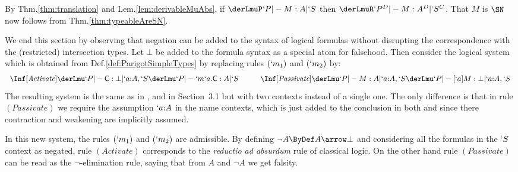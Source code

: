 \documentclass{CSML}
\begin{document}
 \begin{Proof} By Thm.\skp\ref{thm:translation} and Lem.\skp\ref{lem:derivableMuAbs}, if $\derLmuP `P |- M : A | `S $ then $\derLmuR`P^D |- M : A^D | `S^C $. 
That $M$ is $\SN$ now follows from Thm.\skp\ref{thm:typeableAreSN}.
 \end{Proof}


We end this section by observing that negation can be added to the syntax of logical formulas without disrupting the correspondence with the (restricted) intersection types. Let $\bot$ be added to the formula syntax as a special atom for falsehood. Then consider the logical system which is obtained from Def.\skp\ref{def:ParigotSimpleTypes} by replacing rules $(`m_1)$ and $(`m_2)$ by:
%
 \[ \begin{array}{c@{\hspace{1cm}}c}
\Inf	[\textit{Activate}]
	{ \derLmu `P |- {\Cmd} : {\bot} | `a{:}A,`S
	}{ \derLmu `P |- {`m`a.\Cmd} : A | `S }
 & 
\Inf	[\textit{Passivate}]
	{\derLmu `P |- M : A | `a{:}A,`S
	}{ \derLmu `P |- [`a]M : {\bot} | `a{:}A,`S }
 \end{array} \]
The resulting system is the same as in \cite{Bierman'98}, and in \cite{Parigot00} Section~3.1 but with two contexts instead of a single one. 
The only difference is that in rule $(\textit{Passivate})$ we require the assumption $`a{:}A$ in the name contexts, which is just added to the conclusion in both \cite{Bierman'98} and \cite{Parigot00} since there contraction and weakening are implicitly assumed.

In this new system, the rules $(`m_1)$ and $(`m_2)$ are admissible. By defining $\neg A \ByDef A\arrow\bot$ and considering all the formulas in the $`S$ context as negated, rule $(\textit{Activate})$ corresponds to the \emph{reductio ad absurdum} rule of classical logic. On the other hand rule $(\textit{Passivate})$ can be read as the $\neg$-elimination rule, saying that from $A$ and $\neg A$ we get falsity.
\end{document}
